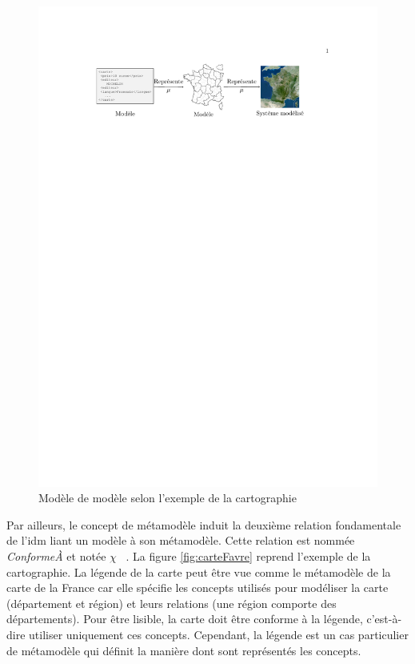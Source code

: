 \begin{figure}[!ht]
    \centering
    \includegraphics[trim=100 640 120 100, clip]{figures/3_etat_de_l_art_IDM/modele_carte.pdf} %
    \caption{Modèle de modèle selon l'exemple de la cartographie~\protect\cite{favre2006ingenierie}}
    \label{fig:modelofmodel}
\end{figure}

Par ailleurs, le concept de métamodèle induit la deuxième relation fondamentale 
de l'\gls{idm} liant un modèle à son métamodèle. Cette relation est nommée 
\textit{ConformeÀ} et notée $\chi$~\cite{bezivin2004search} 
\cite{favre2004towards}. La figure \ref{fig:carteFavre} reprend l'exemple de la 
cartographie. La légende de la carte peut être vue comme le métamodèle de la
carte de la France car elle spécifie les concepts utilisés pour modéliser la carte
(département et région) et leurs relations (une région comporte des départements).
Pour être lisible, la carte doit être conforme à la légende, c'est-à-dire utiliser
uniquement ces concepts. Cependant, la légende est un cas particulier de métamodèle 
qui définit la manière dont sont représentés les concepts. 

